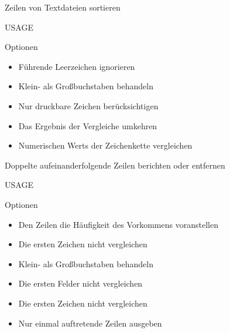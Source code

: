 \documentclass[aspectratio=43]{beamer}
\begin{document}
\begin{frame} 
	\begin{block}{} 
        Zeilen von Textdateien sortieren
	\end{block}
	\begin{block}{USAGE} 
	\end{block}
	\begin{exampleblock}{Optionen} 
	\begin{itemize}
	\item {} \newline Führende Leerzeichen ignorieren
	\item {} Klein- als Großbuchstaben behandeln
	\item {} \newline Nur druckbare Zeichen berücksichtigen
	\item {} Das Ergebnis der Vergleiche umkehren
	\item {} \newline Numerischen Werts der Zeichenkette vergleichen
	\end{itemize}
	\end{exampleblock}
\end{frame}

\begin{frame} 
	\begin{block}{} 
         Doppelte aufeinanderfolgende Zeilen berichten oder entfernen
	\end{block}
	\begin{block}{USAGE} 
	\end{block}
	\begin{exampleblock}{Optionen} 
	\vspace{-0.3cm}
	\begin{itemize}
	\item {} \newline Den Zeilen die Häufigkeit des Vorkommens voranstellen
	\item {}   Die ersten  Zeichen nicht vergleichen
	\item {} Klein- als Großbuchstaben behandeln
	\item {} Die ersten  Felder nicht vergleichen
	\item {} Die ersten  Zeichen nicht vergleichen
	\item {} Nur einmal auftretende Zeilen ausgeben	
	\end{itemize}
	\end{exampleblock}
\end{frame}
\end{document}
